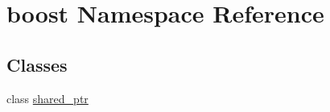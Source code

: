 \hypertarget{namespaceboost}{}\section{boost Namespace Reference}
\label{namespaceboost}
\subsection*{Classes}
\begin{DoxyCompactItemize}
\item 
class \hyperlink{classboost_1_1shared__ptr}{shared\+\_\+ptr}
\end{DoxyCompactItemize}
